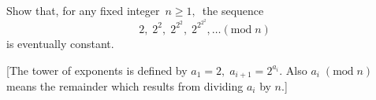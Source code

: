 Show that, for any fixed integer $\,n \geq 1,\,$ the sequence \[ 2, \; 2^2, \; 2^{2^2}, \; 2^{2^{2^2}}, \ldots (\mbox{mod} \; n)  \]is eventually constant.

[The tower of exponents is defined by $a_1 = 2, \; a_{i+1} = 2^{a_i}$. Also $a_i \; (\mbox{mod} \; n)$ means the remainder which results from dividing $a_i$ by $n$.]